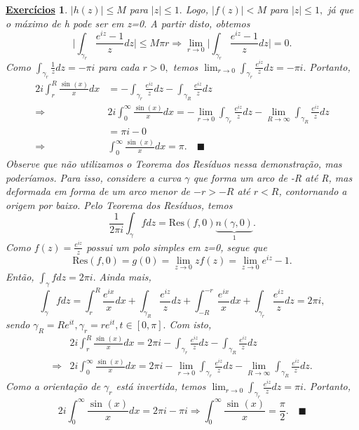 \documentclass{article}
\newtheorem*{exer*}{\underline{Exerc\'icios}}
\renewcommand\qedsymbol{$\blacksquare$}
\begin{document}
\begin{exer*}
    \(|h(z)|\leq M\) para \(|z|\leq 1.\) Logo, \(|f(z)| < M\) para \(|z|\leq 1,\) já que o máximo de h pode ser em z=0. A partir disto, obtemos 
    \[
      \biggl\vert \int_{\gamma_{r}}^{}\frac{e^{iz}-1}{z}dz \biggr\vert \leq M\pi r \Rightarrow \lim_{r\to 0}\biggl\vert \int_{\gamma_{r}}^{}\frac{e^{iz}-1}{z}dz \biggr\vert = 0.
    \]
    Como \(\int_{\gamma_{r}}^{}\frac{1}{z}dz = -\pi i  \) para cada \(r > 0,\) temos \(\lim_{r\to 0}\int_{\gamma_{r}}^{}\frac{e^{iz}}{z}dz = -\pi i.\)
    Portanto,
    \begin{align*}
      2i \int_{r}^{R}\frac{\sin^{}{(x)}}{x}dx &= -\int_{\gamma_{r}}^{}\frac{e^{iz}}{z}dz - \int_{\gamma_{R}}^{}\frac{e^{iz}}{z}dz\\
      \Rightarrow &2i \int_{0}^{\infty}\frac{\sin^{}{(x)}}{x}dx= -\lim_{r\to 0}\int_{\gamma_{r}}^{}\frac{e^{iz}}{z}dz - \lim_{R\to \infty}\int_{\gamma_R}^{}\frac{e^{iz}}{z}dz\\
                  &=\pi i - 0\\
      \Rightarrow &\int_{0}^{\infty}\frac{\sin^{}{(x)}}{x}dx = \pi .\quad \text{\qedsymbol}
    \end{align*}
    Observe que não utilizamos o Teorema dos Resíduos nessa demonstração, mas poderíamos. Para isso, considere a curva \(\gamma \)
    que forma um arco de -R até R, mas deformada em forma de um arco menor de \(-r > -R\) até \(r < R\), contornando a origem por baixo. Pelo Teorema
    dos Resíduos, temos 
    \[
      \frac{1}{2\pi i}\int_{\gamma }^{}f dz = \mathrm{Res}(f, 0)\underbrace{n(\gamma , 0)}_{1}. 
    \]
    Como \(f(z) = \frac{e^{iz}}{z}\) possui um polo simples em z=0, segue que 
    \[
      \mathrm{Res}(f, 0) = g(0) = \lim_{z\to 0}zf(z) = \lim_{z\to 0}e^{iz}-1.
    \]
    Então, \(\int_{\gamma }^{}f dz = 2\pi i.\) Ainda mais, 
    \[
      \int_{\gamma }^{}f dz = \int_{r}^{R}\frac{e^{ix}}{x}dx + \int_{\gamma _{R}}^{}\frac{e^{iz}}{z}dz + \int_{-R}^{-r}\frac{e^{ix}}{x}dx + \int_{\gamma_{r}}^{}\frac{e^{iz}}{z}dz = 2\pi i,
    \]
    sendo \(\gamma _{R} = R e^{it}, \gamma_{r} = r e^{it}, t\in[0, \pi ].\) Com isto,
    \begin{align*}
   &2i \int_{r}^{R}\frac{\sin^{}{(x)}}{x}dx =2\pi i - \int_{\gamma_{r}}^{}\frac{e^{iz}}{z}dz - \int_{\gamma_{R}}^{}\frac{e^{iz}}{z}dz\\
      \Rightarrow &2i \int_{0}^{\infty}\frac{\sin^{}{(x)}}{x}dx = 2\pi i - \lim_{r\to 0}\int_{\gamma_{r}}^{}\frac{e^{iz}}{z}dz - \lim_{R\to \infty}\int_{\gamma_{R}}^{}\frac{e^{iz}}{z}dz.
    \end{align*}
    Como a orientação de \(\gamma_r \) está invertida, temos \(\lim_{r\to 0}\int_{\gamma_{r}}^{}\frac{e^{iz}}{z}dz = \pi i.\) Portanto,
    \[
      2i \int_{0}^{\infty}\frac{\sin^{}{(x)}}{x}dx = 2\pi i - \pi i \Rightarrow \int_{0}^{\infty}\frac{\sin^{}{(x)}}{x} = \frac{\pi }{2}.\quad \text{\qedsymbol}
    \]
  \end{exer*}
\end{document}
